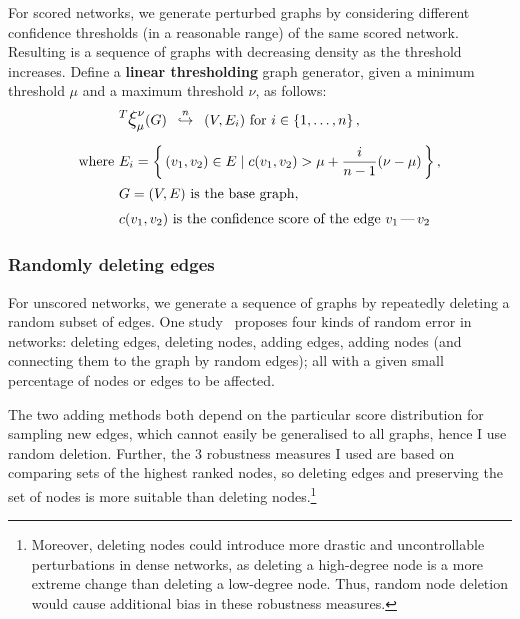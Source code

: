 For scored networks, we generate perturbed graphs by considering different confidence thresholds (in a reasonable range) of the same scored network.
Resulting is a sequence of graphs with decreasing density as the threshold increases.
Define a \textbf{linear thresholding} graph generator, given a minimum threshold $\mu$ and a maximum threshold $\nu$, as follows:
\begin{align}
    &\mathlarger{^T \mathlarger{\xi}}_{\mu}^{\nu}(G) \generates{n} (V, E_i)~\text{for}~i\in \integersto{n}, \\[6pt]
    \text{where}~& E_i = \Set{(v_1, v_2)\in E}{ c(v_1, v_2) > \mu + \frac{i}{n - 1}(\nu - \mu) }, \nonumber \\
    &G = (V, E)~\text{is the base graph}, \nonumber \\
    &c(v_1, v_2)~\text{is the confidence score of the edge $v_1\,\text{---}\,v_2$} \nonumber
\end{align}



\subsubsection*{Randomly deleting edges}\label{sec:randomly_removing_edges}

For unscored networks, we generate a sequence of graphs by repeatedly deleting a random subset of edges.
One study~\cite{BorgattiRobustnessCentralityMeasures2006} proposes four kinds of random error in networks: deleting edges, deleting nodes, adding edges, adding nodes (and connecting them to the graph by random edges); all with a given small percentage of nodes or edges to be affected.

The two adding methods both depend on the particular score distribution for sampling new edges, which cannot easily be generalised to all graphs, hence I use random deletion.
Further, the 3 robustness measures I used are based on comparing sets of the highest ranked nodes, so deleting edges and preserving the set of nodes is more suitable than deleting nodes.\footnote{Moreover, deleting nodes could introduce more drastic and uncontrollable perturbations in dense networks, as deleting a high-degree node is a more extreme change than deleting a low-degree node. Thus, random node deletion would cause additional bias in these robustness measures.}

